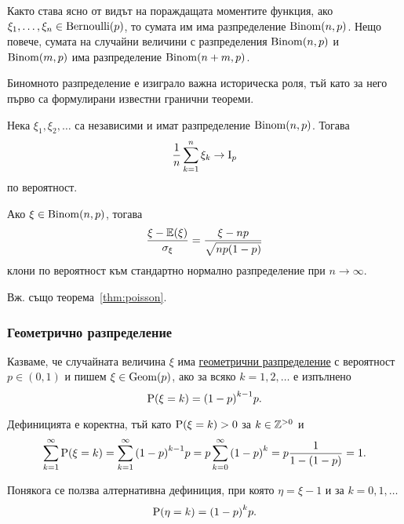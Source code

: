 \documentclass[numbers=endperiod, DIV=15, bibliography=totocnumbered]{scrartcl}
\begin{document}
Както става ясно от видът на пораждащата моментите функция, ако $\xi_1, \ldots, \xi_n \in \operatorname{Bernoulli}(p)$, то сумата им има разпределение $\operatorname{Binom}(n, p)$. Нещо повече, сумата на случайни величини с разпределения $\operatorname{Binom}(n, p)$ и $\operatorname{Binom}(m, p)$ има разпределение $\operatorname{Binom}(n + m, p)$.

Биномното разпределение е изиграло важна историческа роля, тъй като за него първо са формулирани известни гранични теореми.

\begin{theorem}\label{thm:bernoulli}
  Нека $\xi_1, \xi_2, \ldots$ са независими и имат разпределение $\operatorname{Binom}(n, p)$. Тогава
  \begin{displaymath}
    \frac 1 n \sum_{k=1}^n \xi_k
    \to
    \operatorname{I}_p
  \end{displaymath}
  по вероятност.
\end{theorem}

\begin{theorem}\label{thm:moivre-laplace}
  Ако $\xi \in \operatorname{Binom}(n, p)$, тогава
  \begin{displaymath}
    \frac {\xi - \mathbb{E}(\xi)} {\sigma_\xi}
    =
    \frac {\xi - np} {\sqrt{np(1-p)}}
  \end{displaymath}
  клони по вероятност към стандартно нормално разпределение при $n \to \infty$.
\end{theorem}

Вж. също теорема~\ref{thm:poisson}.

\subsubsection{Геометрично разпределение}\label{dist:geom}

\begin{definition}
  Казваме, че случайната величина $\xi$ има \uline{геометрични разпределение} с вероятност $p \in (0, 1)$ и пишем $\xi \in \operatorname{Geom}(p)$, ако за всяко $k = 1, 2, \ldots$ е изпълнено
  \begin{displaymath}
    \operatorname{P}(\xi = k) = {(1-p)}^{k-1} p.
  \end{displaymath}

  Дефиницията е коректна, тъй като $\operatorname{P}(\xi = k) > 0$ за $k \in \mathbb{Z}^{> 0}$ и
  \begin{displaymath}
    \sum_{k=1}^\infty \operatorname{P}(\xi = k)
    =
    \sum_{k=1}^\infty {(1-p)}^{k-1} p
    =
    p \sum_{k=0}^\infty {(1-p)}^k
    =
    p \frac 1 {1-(1-p)}
    =
    1.
  \end{displaymath}

  Понякога се ползва алтернативна дефиниция, при която $\eta = \xi - 1$ и за $k = 0, 1, \ldots$
  \begin{displaymath}
    \operatorname{P}(\eta = k) = {(1-p)}^k p.
  \end{displaymath}
\end{definition}
\end{document}
